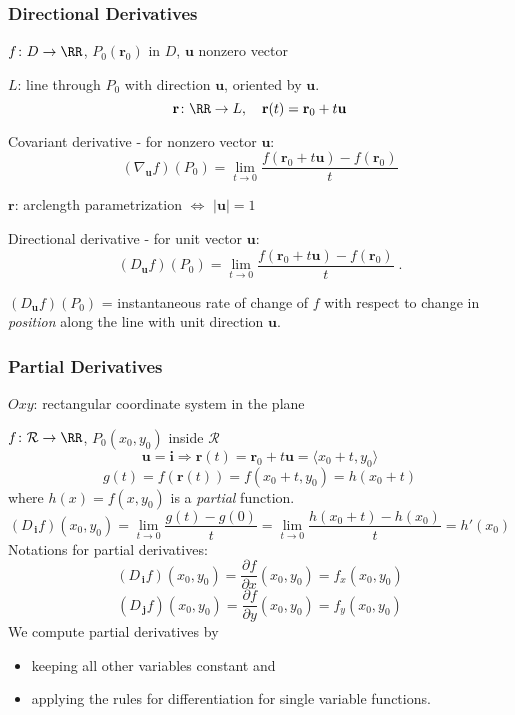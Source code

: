 \begin{frame}
  \frametitle{Directional Derivatives}

  $f \colon D \to \RR$, $P_0(\textbf{r}_0)$ in $D$,
  $\textbf{u}$ nonzero vector

  $L$: line through $P_0$ with direction $\textbf{u}$,
  \textcolor[rgb]{0.98,0.00,0.00}{oriented} by $\textbf{u}$.
  $$\textbf{r}\colon \RR \to L, \quad \textbf{r}(t) =
  \textbf{r}_0+t\textbf{u}$$

  \pause \textcolor[rgb]{0.98,0.00,0.00}{Covariant derivative} -
  for \textcolor[rgb]{0.98,0.00,0.00}{nonzero} vector $\textbf{u}$:
  $$(\nabla_{\textbf{u}} f) (P_0) = \lim_{t\to 0}
  \frac{f(\textbf{r}_0+t\textbf{u}) - f(\textbf{r}_0)}{t}$$

  \pause $\textbf{r}$: arclength parametrization \pause
  $\Longleftrightarrow$ $|\textbf{u}|=1$

  \pause \textcolor[rgb]{0.98,0.00,0.00}{Directional derivative} - for \textcolor[rgb]{0.98,0.00,0.00}{unit} vector
  $\textbf{u}$:
  $$(D_{\textbf{u}} f)(P_0) =
  \lim_{t\to 0} \frac{f(\textbf{r}_0+t\textbf{u})-f(\textbf{r}_0)}{t}\; .$$

  \pause $(D_{\textbf{u}} f)(P_0)$ = instantaneous rate of change of $f$
  with respect to change in \emph{position} along the line
  with \textcolor[rgb]{0.98,0.00,0.00}{unit} direction $\textbf{u}$.
\end{frame}

\begin{frame}
  \frametitle{Partial Derivatives}

  $Oxy$: rectangular coordinate system in the plane

  $f\colon \mathcal{R} \to \RR$,  $P_0(x_0,y_0)$ inside $\mathcal{R}$
  $$\textbf{u}=\textbf{i} \Longrightarrow \textbf{r}(t) = \textbf{r}_0 + t\textbf{u} = \langle x_0+t, y_0 \rangle$$
  $$g(t) = f(\textbf{r}(t)) = f(x_0+t, y_0)= h(x_0+t)$$
  where $h(x) = f(x,y_0)$ is a \emph{partial} function.\pause
  $$(D_{\,\textbf{i}} f)(x_0,y_0) = \lim_{t\to 0} \frac{g(t)-g(0)}{t}
  =\lim_{t\to 0} \frac{h(x_0+t) -h(x_0)}{t} = h'(x_0)$$
\pause Notations for \textcolor[rgb]{0.98,0.00,0.00}{partial derivatives}:
%
$$(D_{\,\textbf{i}}f)(x_0,y_0) = \frac{\partial f}{\partial x}(x_0,y_0) =
f_x(x_0,y_0)$$
%
$$(D_{\,\textbf{j}}f)(x_0,y_0) =  \frac{\partial f}{\partial y}(x_0,y_0) =
f_y(x_0,y_0)$$
%
\pause We compute partial derivatives by
\begin{itemize}
  \item keeping all other variables constant and
  \item applying the rules for differentiation for single variable functions.
\end{itemize}
\end{frame}


